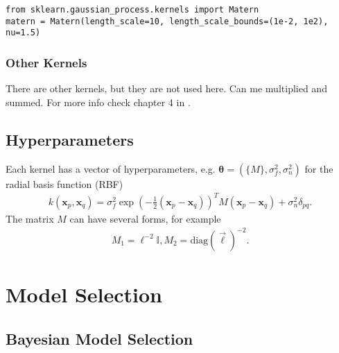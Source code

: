 \documentclass[twoside,english]{uiofysmaster}
\begin{document}
\begin{lstlisting}
from sklearn.gaussian_process.kernels import Matern
matern = Matern(length_scale=10, length_scale_bounds=(1e-2, 1e2), nu=1.5)
\end{lstlisting}

\subsubsection{Other Kernels}

There are other kernels, but they are not used here. Can me multiplied and summed. For more info check chapter 4 in \cite{rasmussen2006gaussian}.





\subsection{Hyperparameters}

Each kernel has a vector of hyperparameters, e.g. $\boldsymbol{\theta} = (\{M\}, \sigma^2_f, \sigma_n^2)$ for the radial basis function (RBF)
\begin{align}
k(\textbf{x}_p, \textbf{x}_q) = \sigma_f^2 \exp (- \frac{1}{2} (\textbf{x}_p - \textbf{x}_q))^T M (\textbf{x}_p - \textbf{x}_q) + \sigma_n^2 \delta_{pq}.
\end{align}
The matrix $M$ can have several forms, for example
\begin{align}
M_1 = \ell^{-2} \mathbb{I} , M_2 = \text{diag}(\vec{\ell})^{-2}.
\end{align}



\section{Model Selection}



\subsection{Bayesian Model Selection}
\end{document}
